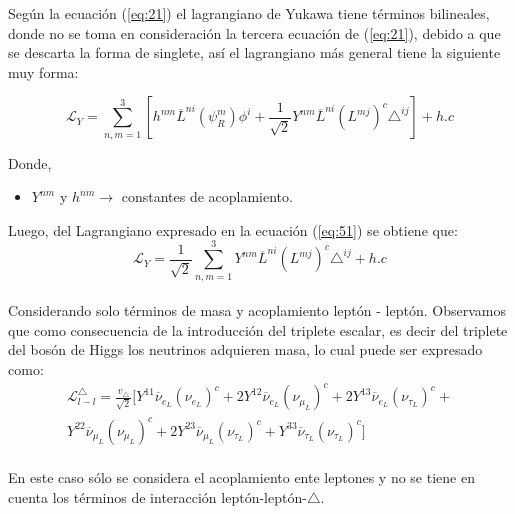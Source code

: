 \documentclass[12pt]{article}
\begin{document}
Según la ecuación (\ref{eq:21}) el lagrangiano de Yukawa tiene términos bilineales, donde no se toma en consideración la tercera ecuación de (\ref{eq:21}), debido a que se descarta la forma de singlete, así el lagrangiano más general tiene la siguiente muy forma: 

\begin{equation}
    \label{eq:51}
    \mathcal{L}_Y=  \sum_{n,m=1}^3 [ h^{nm} \overline{L}^{ni} ({\psi_R^{m}})\phi^i + \frac{1}{\sqrt{2}} Y^{nm} \overline{L}^{ni} ({L^{mj}})^{c} \triangle^{ij}] + h.c
\end{equation}

Donde, 

\begin{itemize}
    \item $Y^{nm}$ y $h^{nm} \rightarrow $ constantes de acoplamiento. 
\end{itemize}

  

Luego, del Lagrangiano expresado en la ecuación (\ref{eq:51}) se obtiene que: \\

\begin{equation}
    \mathcal{L}_Y= \frac{1}{\sqrt{2}} \sum_{n,m=1}^3 Y^{nm} \overline{L}^{ni} ({L^{mj}})^{c} \triangle^{ij} + h.c 
    \label{eq:17}
\end{equation}  \\

Considerando solo términos de masa y acoplamiento leptón - leptón.
Observamos que como consecuencia de la introducción del triplete escalar, es decir del triplete del bosón de Higgs los neutrinos adquieren masa, lo cual puede ser expresado como:\\


\begin{equation}
    \label{eq:mass5}
\begin{aligned}
\mathcal{L}^\triangle_{l-l}= \frac{v_\triangle}{\sqrt2} [Y^{11}\overline{\nu}_{e_L}({\nu}_{e_L})^c + 2Y^{12}\overline{\nu}_{e_L}({\nu}_{\mu_L})^c+ 2Y^{13}\overline{\nu}_{e_L}({\nu}_{\tau_L})^c+ \\
Y^{22}\overline{\nu}_{\mu_L}({\nu}_{\mu_L})^c + 2Y^{23}\overline{\nu}_{\mu_L}({\nu}_{\tau_L})^c+ Y^{33}\overline{\nu}_{\tau_L}({\nu}_{\tau_L})^c
]
\end{aligned}
\end{equation} \\

En este caso sólo se considera el acoplamiento ente leptones y no se tiene en cuenta los términos de interacción leptón-leptón-$\triangle$. 
\end{document}
